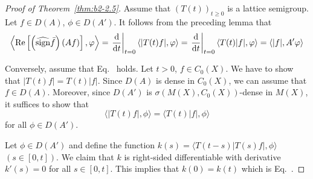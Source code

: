 \begin{proof}[Proof of Theorem~\ref{thm:b2-2.5}]
Assume that $(T(t))_{t \geq 0}$ is a lattice semigroup.
Let $f \in D(A)$, $\phi \in D(A')$.
It follows from the preceding lemma that
\[
\left\langle \Re\left[\left(\widehat{\sign} \bar{f}\right)(Af)\right],\phi \right\rangle 
= \left.\frac{\diff{}}{\dt}\right|_{t=0} \langle |T(t)f|,\phi \rangle = \left.\frac{\diff{}}{\dt}\right|_{t=0} \langle T(t)|f|,\phi \rangle 
= \langle |f|,A'\phi \rangle
\]

Conversely, assume that Eq.~ holds.
Let $t > 0$, $f \in C_{0}(X)$.
We have to show that $|T(t)f| = T(t)|f|$.
Since $D(A)$ is dense in $C_{0}(X)$, we can assume that $f \in D(A)$.
Moreover, since $D(A')$ is $\sigma(M(X),C_{0}(X))$-dense in $M(X)$, it suffices to show that
\begin{equation}\label{eq:b2-2.13}
\langle |T(t)f|,\phi \rangle = \langle T(t)|f|,\phi \rangle
\end{equation}
for all $\phi \in D(A')$.

Let $\phi \in D(A')$ and define the function $k(s) = \langle T(t-s)|T(s)f|,\phi \rangle$ $(s \in [0,t])$.
We claim that $k$ is right-sided differentiable with derivative $k'(s) = 0$ for all $s \in [0,t]$.
This implies that $k(0) = k(t)$ which is Eq.~.


\end{proof}
